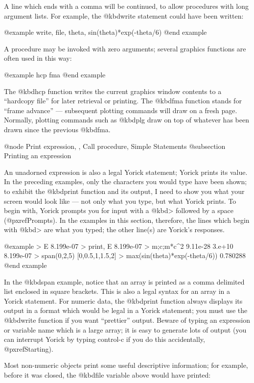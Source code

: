 {A line which ends with a comma will be continued, to allow procedures
with long argument lists.  For example, the @kbd{write} statement could
have been written:

@example
write, file, theta,
             sin(theta)*exp(-theta/6)
@end example

A procedure may be invoked with zero arguments; several graphics
functions are often used in this way:

@example
hcp
fma
@end example

The @kbd{hcp} function writes the current graphics window contents to
a ``hardcopy file'' for later retrieval or printing.  The @kbd{fma}
function stands for ``frame advance'' --- subsequent plotting commands
will draw on a fresh page.  Normally, plotting commands such as
@kbd{plg} draw on top of whatever has been drawn since the previous
@kbd{fma}.


@node Print expression,  , Call procedure, Simple Statements
@subsection Printing an expression

An unadorned expression is also a legal Yorick statement; Yorick prints
its value.  In the preceding examples, only the characters you would
type have been shown; to exhibit the @kbd{print} function and its
output, I need to show you what your screen would look like --- not only
what you type, but what Yorick prints.  To begin with, Yorick prompts
you for input with a @kbd{>} followed by a space (@pxref{Prompts}).  In
the examples in this section, therefore, the lines which begin with
@kbd{>} are what you typed; the other line(s) are Yorick's
responses.

@example
> E
8.199e-07
> print, E
8.199e-07
> m;c;m*c^2
9.11e-28
3.e+10
8.199e-07
> span(0,2,5)
[0,0.5,1,1.5,2]
> max(sin(theta)*exp(-theta/6))
0.780288
@end example

In the @kbd{span} example, notice that an array is printed as a comma
delimited list enclosed in square brackets.  This is also a legal
syntax for an array in a Yorick statement.  For numeric data, the
@kbd{print} function always displays its output in a format which
would be legal in a Yorick statement; you must use the @kbd{write}
function if you want ``prettier'' output.  Beware of typing an
expression or variable name which is a large array; it is easy to
generate lots of output (you can interrupt Yorick by typing control-c
if you do this accidentally, @pxref{Starting}).

Most non-numeric objects print some useful descriptive information;
for example, before it was closed, the @kbd{file} variable above would
have printed:

}
